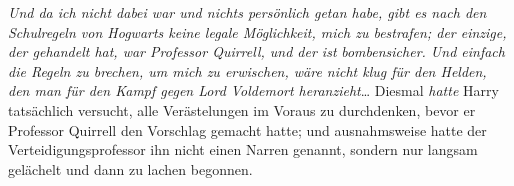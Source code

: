 \emph{Und da ich nicht dabei war und nichts persönlich getan habe, gibt es nach den Schulregeln von Hogwarts keine legale Möglichkeit, mich zu bestrafen; der einzige, der gehandelt hat, war Professor Quirrell, und der ist} \emph{bombensicher. Und einfach die Regeln zu brechen, um mich zu erwischen, wäre nicht klug für den Helden, den man für den Kampf gegen Lord Voldemort heranzieht}… Diesmal \emph{hatte} Harry tatsächlich versucht, alle Verästelungen im Voraus zu durchdenken, bevor er Professor Quirrell den Vorschlag gemacht hatte; und ausnahmsweise hatte der Verteidigungsprofessor ihn nicht einen Narren genannt, sondern nur langsam gelächelt und dann zu lachen begonnen.

